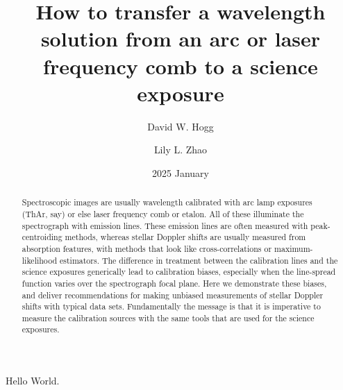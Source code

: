 \documentclass{article}
\title{\bfseries%
How to transfer a wavelength solution from an arc or laser frequency comb to a science exposure}
\author{David W. Hogg \and Lily L. Zhao}
\date{2025 January}
\begin{document}
\maketitle

\begin{abstract}\noindent
Spectroscopic images are usually wavelength calibrated with arc lamp exposures (ThAr, say) or else laser frequency comb or etalon.
All of these illuminate the spectrograph with emission lines.
These emission lines are often measured with peak-centroiding methods, whereas stellar Doppler shifts are usually measured from absorption features, with methods that look like cross-correlations or maximum-likelihood estimators.
The difference in treatment between the calibration lines and the science exposures generically lead to calibration biases, especially when the line-spread function varies over the spectrograph focal plane.
Here we demonstrate these biases, and deliver recommendations for making unbiased measurements of stellar Doppler shifts with typical data sets.
Fundamentally the message is that it is imperative to measure the calibration sources with the same tools that are used for the science exposures.
\end{abstract}

Hello World.
\end{document}
